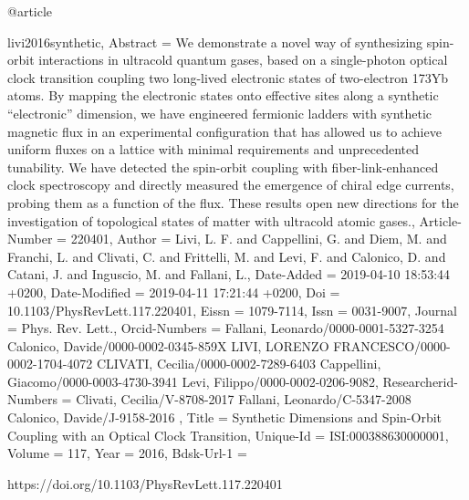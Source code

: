 \documentclass[epj,final]{svjour}
\begin{document}
{{{{{{{{{@article{livi2016synthetic,
	Abstract = {{We demonstrate a novel way of synthesizing spin-orbit interactions in
   ultracold quantum gases, based on a single-photon optical clock
   transition coupling two long-lived electronic states of two-electron
   173Yb atoms. By mapping the electronic states onto effective sites along
   a synthetic ``electronic{''} dimension, we have engineered fermionic
   ladders with synthetic magnetic flux in an experimental configuration
   that has allowed us to achieve uniform fluxes on a lattice with minimal
   requirements and unprecedented tunability. We have detected the
   spin-orbit coupling with fiber-link-enhanced clock spectroscopy and
   directly measured the emergence of chiral edge currents, probing them as
   a function of the flux. These results open new directions for the
   investigation of topological states of matter with ultracold atomic
   gases.}},
	Article-Number = {{220401}},
	Author = {Livi, L. F. and Cappellini, G. and Diem, M. and Franchi, L. and Clivati, C. and Frittelli, M. and Levi, F. and Calonico, D. and Catani, J. and Inguscio, M. and Fallani, L.},
	Date-Added = {2019-04-10 18:53:44 +0200},
	Date-Modified = {2019-04-11 17:21:44 +0200},
	Doi = {{10.1103/PhysRevLett.117.220401}},
	Eissn = {{1079-7114}},
	Issn = {{0031-9007}},
	Journal = {Phys. Rev. Lett.},
	Orcid-Numbers = {{Fallani, Leonardo/0000-0001-5327-3254 Calonico, Davide/0000-0002-0345-859X LIVI, LORENZO FRANCESCO/0000-0002-1704-4072 CLIVATI, Cecilia/0000-0002-7289-6403 Cappellini, Giacomo/0000-0003-4730-3941 Levi, Filippo/0000-0002-0206-9082}},
	Researcherid-Numbers = {{Clivati, Cecilia/V-8708-2017 Fallani, Leonardo/C-5347-2008 Calonico, Davide/J-9158-2016 }},
	Title = {{Synthetic Dimensions and Spin-Orbit Coupling with an Optical Clock Transition}},
	Unique-Id = {{ISI:000388630000001}},
	Volume = {{117}},
	Year = {{2016}},
	Bdsk-Url-1 = {https://doi.org/10.1103/PhysRevLett.117.220401

}}}}}}}}}}}
\end{document}
